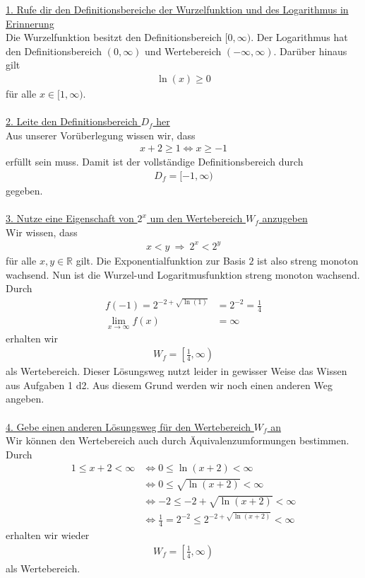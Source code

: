 \underline{1. Rufe dir den Definitionsbereiche der Wurzelfunktion und des Logarithmus in Erinnerung }\\
Die Wurzelfunktion besitzt den Definitionsbereich $[0, \infty)$.
Der Logarithmus hat den Definitionsbereich $(0, \infty)$ und Wertebereich $(-\infty, \infty) $.
Darüber hinaus gilt
\begin{align*}
\ln(x) \geq 0
\end{align*}
für alle $x \in [1,\infty)$.  
\\
\\
\underline{2. Leite den Definitionsbereich $D_f$ her}\\
Aus unserer Vorüberlegung wissen wir, dass 
\begin{align*}
x+2 \geq 1
\Leftrightarrow
x \geq -1
\end{align*}
erfüllt sein muss.
Damit ist der vollständige Definitionsbereich durch
\begin{align*}
D_f = [-1, \infty)
\end{align*}
gegeben.
\\
\\
\underline{3. Nutze eine Eigenschaft von $2^x$ um den Wertebereich $W_f$ anzugeben}\\
Wir wissen, dass 
\begin{align*}
x < y \ \Rightarrow \ 2^x < 2^y
\end{align*}
für alle $x,y \in \mathbb{R}$ gilt.
Die Exponentialfunktion zur Basis $2$ ist also streng monoton wachsend.
Nun ist die Wurzel-und Logaritmusfunktion streng monoton wachsend.
Durch
\begin{align*}
f(-1) = 2^{-2+\sqrt{\ln(1)}} &= 2^{-2} = \frac{1}{4}\\
\lim \limits_{x \rightarrow \infty} f(x) &= \infty
\end{align*}
erhalten wir 
\begin{align*}
W_f = \left[\frac{1}{4}, \infty \right)
\end{align*}
als Wertebereich.
Dieser Lösungsweg nutzt leider in gewisser Weise das Wissen aus Aufgaben 1 d2.
Aus diesem Grund werden wir noch einen anderen Weg angeben.\\
\\
\underline{4. Gebe einen anderen Lösungsweg für den Wertebereich $W_f$ an}\\
Wir können den Wertebereich auch durch Äquivalenzumformungen bestimmen.
Durch 
\begin{align*}
1 \leq x+2 < \infty
&\Leftrightarrow
0 \leq \ln(x+2) < \infty\\
&\Leftrightarrow
0 \leq \sqrt{\ln(x+2)} < \infty\\
&\Leftrightarrow
-2 \leq -2 + \sqrt{\ln(x+2)} < \infty\\
&\Leftrightarrow
\frac{1}{4} =2^{-2} \leq 2^{-2 + \sqrt{\ln(x+2)}} < \infty
\end{align*}
erhalten wir wieder
\begin{align*}
W_f = \left[ \frac{1}{4}, \infty \right)
\end{align*}
als Wertebereich.

